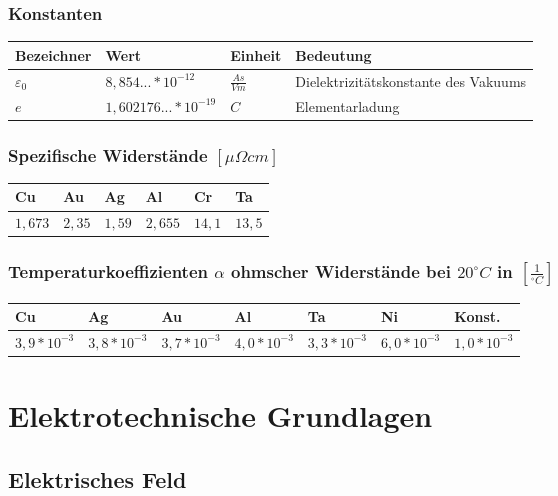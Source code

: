 \documentclass[12pt,a4paper]{article}%
\numberwithin{equation}{section}
\begin{document}
\subsubsection{Konstanten}
\begin{tabular} {|p{2cm}|p{4cm}|p{1.5cm}|p{5.5cm}|} \hline
Bezeichner & Wert & Einheit & Bedeutung \\ \hline
\rule{0pt}{15pt}
$\varepsilon_0$ & $8,854... * 10^{-12}$ & $\frac{As}{Vm}$ & Dielektrizitätskonstante des Vakuums \\ \hline
$e$ & $1,602176... * 10^{-19}$ & $C$ & Elementarladung \\ \hline
\end{tabular}

\subsubsection{Spezifische Widerstände $\left[\mu \Omega cm \right]$}
\begin{tabularx}{14.7cm}{|X|X|X|X|X|X|}\hline
Cu & Au & Ag & Al & Cr & Ta \\ \hline
$1,673$ & $2,35$ & $1,59$ & $2,655$ & $14,1$ & $13,5$ \\ \hline
\end{tabularx}

\subsubsection{Temperaturkoeffizienten $\alpha$ ohmscher Widerstände bei $20^{\circ} C$ in $\left[\frac{1}{^{\circ} C} \right]$}
\begin{tabularx}{14.7cm}{|X|X|X|X|X|X|X|} \hline
Cu & Ag & Au & Al & Ta & Ni & Konst. \\ \hline
$3,9 * 10^{-3}$ & $3,8 * 10^{-3}$ & $3,7 * 10^{-3}$ & $4,0 * 10^{-3}$ & $3,3 * 10^{-3}$ & $6,0 * 10^{-3}$ & $1,0 * 10^{-3}$ \\ \hline
\end{tabularx}
\newpage

\section{Elektrotechnische Grundlagen}
\subsection{Elektrisches Feld}
\end{document}
